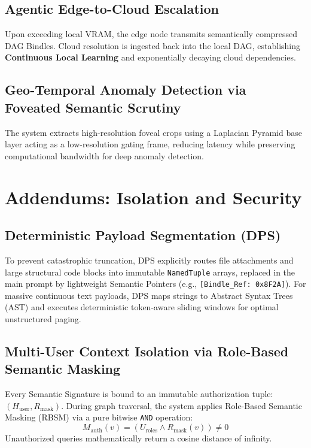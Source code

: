 \documentclass[11pt, a4paper]{article}
\begin{document}
	\subsection{Agentic Edge-to-Cloud Escalation}
	Upon exceeding local VRAM, the edge node transmits semantically compressed DAG Bindles. Cloud resolution is ingested back into the local DAG, establishing \textbf{Continuous Local Learning} and exponentially decaying cloud dependencies.

	\subsection{Geo-Temporal Anomaly Detection via Foveated Semantic Scrutiny}
	The system extracts high-resolution foveal crops using a Laplacian Pyramid base layer acting as a low-resolution gating frame, reducing latency while preserving computational bandwidth for deep anomaly detection.
    
	\section{Addendums: Isolation and Security}
	
	\subsection{Deterministic Payload Segmentation (DPS)}
	To prevent catastrophic truncation, DPS explicitly routes file attachments and large structural code blocks into immutable \texttt{NamedTuple} arrays, replaced in the main prompt by lightweight Semantic Pointers (e.g., \texttt{[Bindle\_Ref: 0x8F2A]}). For massive continuous text payloads, DPS maps strings to Abstract Syntax Trees (AST) and executes deterministic token-aware sliding windows for optimal unstructured paging.
	
	\subsection{Multi-User Context Isolation via Role-Based Semantic Masking}
	Every Semantic Signature is bound to an immutable authorization tuple: $(H_{\text{user}}, R_{\text{mask}})$. During graph traversal, the system applies Role-Based Semantic Masking (RBSM) via a pure bitwise \texttt{AND} operation:
	\begin{equation}
		M_{\text{auth}}(v) = (U_{\text{roles}} \land R_{\text{mask}}(v)) \neq 0
	\end{equation}
	Unauthorized queries mathematically return a cosine distance of infinity.
	
\end{document}
